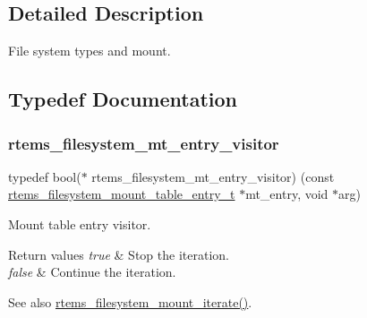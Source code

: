 \subsection{Detailed Description}
File system types and mount. 



\subsection{Typedef Documentation}
\mbox{\label{group__FileSystemTypesAndMount_ga84a7a5cd36614b906e1c485224beb686}} 
\subsubsection{\texorpdfstring{rtems\_filesystem\_mt\_entry\_visitor}{rtems\_filesystem\_mt\_entry\_visitor}}
{\footnotesize\ttfamily typedef bool($\ast$ rtems\+\_\+filesystem\+\_\+mt\+\_\+entry\+\_\+visitor) (const \mbox{\hyperlink{structrtems__filesystem__mount__table__entry__tt}{rtems\+\_\+filesystem\+\_\+mount\+\_\+table\+\_\+entry\+\_\+t}} $\ast$mt\+\_\+entry, void $\ast$arg)}



Mount table entry visitor. 


\begin{DoxyRetVals}{Return values}
{\em true} & Stop the iteration. \\
\hline
{\em false} & Continue the iteration.\\
\hline
\end{DoxyRetVals}
\begin{DoxySeeAlso}{See also}
\mbox{\hyperlink{group__FileSystemTypesAndMount_ga0b6051a3ebc57b6b7c37bcfa2132b66f}{rtems\+\_\+filesystem\+\_\+mount\+\_\+iterate()}}. 
\end{DoxySeeAlso}
\mbox{\label{group__FileSystemTypesAndMount_gaa40c0b8e4e5abe60a08bead5b3c72241}} 
